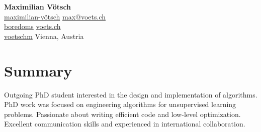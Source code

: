 \documentclass[a4paper, 10pt]{article}
\newcommand{\iconSpace}{\hspace{2px}}
\newcommand{\hSpace}{\hspace{8px}}
\newcommand{\secStartSpace}{\vspace{3pt}}
\newcommand{\secEndSpace}{\vspace{5pt}}
\newcommand{\spaceCollapse}{\vspace{-2pt}}
\begin{document}
\begin{center} 
	{\Huge \textbf{Maximilian V\"otsch}}\\
	\vspace{1px}
 \color{text-color}
	{
		\color{secondary}
             \iconSpace \href{https://www.linkedin.com/in/maximilian-vötsch/}{maximilian-vötsch}
		\hfill
		\href{mailto:max@voets.ch}{max@voets.ch} \vspace{2pt} \iconSpace {} 
        }\\
	{
        \color{secondary}
			 \iconSpace \href{https://github.com/boredoms}{boredoms}
        \hfill
		\href{https://voets.ch/}{voets.ch} \vspace{2pt} \iconSpace {} 
		}\\
	{
		\color{secondary}
			 \iconSpace \href{https://gitlab.com/voetschm}{voetschm}
		\hfill
		Vienna, Austria \vspace{2pt} \iconSpace {}
	}
\end{center}
\spaceCollapse
\spaceCollapse


\section{\color{highlight} \textbf{Summary}}
\secStartSpace
\begin{addmargin}[0.5em]{1em}
	Outgoing PhD student interested in the design and implementation of algorithms.
	PhD work was focused on engineering algorithms for unsupervised learning problems.
	Passionate about writing efficient code and low-level optimization.
	Excellent communication skills and experienced in international collaboration.
\end{addmargin}
\secEndSpace
\secEndSpace


\end{document}
